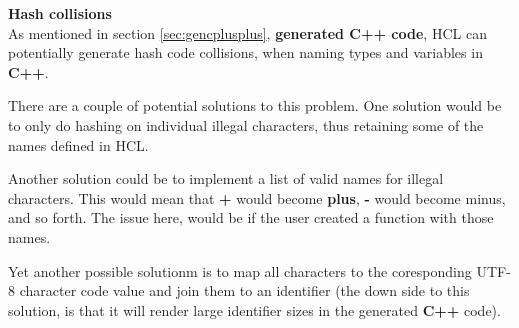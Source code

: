 \textbf{Hash collisions}\\
As mentioned in section \ref{sec:gencplusplus}, \textbf{generated C++ code}, HCL can potentially generate hash code collisions, when naming types and variables in \textbf{C++}.

There are a couple of potential solutions to this problem.
One solution would be to only do hashing on individual illegal characters, thus retaining some of the names defined in HCL.

Another solution could be to implement a list of valid names for illegal characters.
This would mean that \textbf{+} would become \textbf{plus}, \textbf{-} would become minus, and so forth.
The issue here, would be if the user created a function with those names.

Yet another possible solutionm is to map all characters to the coresponding UTF-8 character code value and join them to an identifier (the down side to this solution, is that it will render large identifier sizes in the generated \textbf{C++} code).

